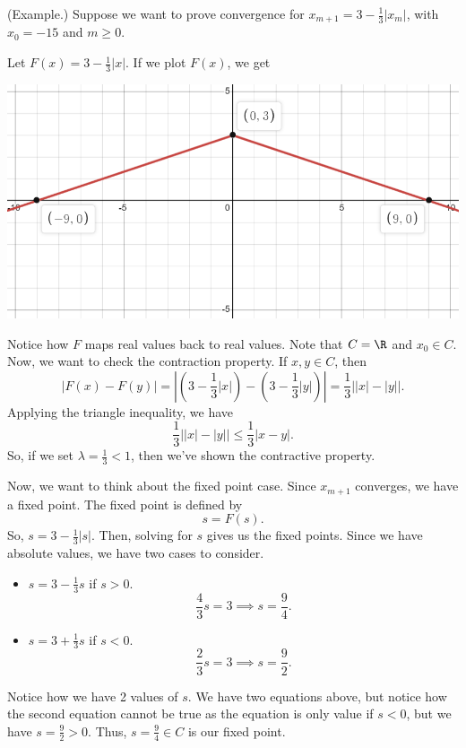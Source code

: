\documentclass[letterpaper]{article}
\begin{document}
\begin{mdframed}
    (Example.) Suppose we want to prove convergence for $x_{m + 1} = 3 - \frac{1}{3} |x_m|$, with $x_0 = -15$ and $m \geq 0$. 

    \bigskip 

    Let $F(x) = 3 - \frac{1}{3}|x|$. If we plot $F(x)$, we get 
    \begin{center}
        \includegraphics[scale=0.7]{../assets/contractive_ex1.png}
    \end{center}
    Notice how $F$ maps real values back to real values. Note that $C = \R$ and $x_0 \in C$. Now, we want to check the contraction property. If $x, y \in C$, then \[|F(x) - F(y)| = \left|\left(3 - \frac{1}{3}|x|\right) - \left(3 - \frac{1}{3}|y|\right)\right| = \frac{1}{3}\left||x| - |y|\right|.\]
    Applying the triangle inequality, we have 
    \[\frac{1}{3}\left||x| - |y|\right| \leq \frac{1}{3}|x - y|.\]
    So, if we set $\lambda = \frac{1}{3} < 1$, then we've shown the contractive property. 

    \bigskip 

    Now, we want to think about the fixed point case. Since $x_{m + 1}$ converges, we have a fixed point. The fixed point is defined by 
    \[s = F(s).\]
    So, $s = 3 - \frac{1}{3}|s|$. Then, solving for $s$ gives us the fixed points. Since we have absolute values, we have two cases to consider. 
    \begin{itemize}
        \item $s = 3 - \frac{1}{3}s$ if $s > 0$.
        \[\frac{4}{3}s = 3 \implies s = \frac{9}{4}.\]
        \item $s = 3 + \frac{1}{3}s$ if $s < 0$.
        \[\frac{2}{3}s = 3 \implies s = \frac{9}{2}.\]
    \end{itemize}
    Notice how we have 2 values of $s$. We have two equations above, but notice how the second equation cannot be true as the equation is only value if $s < 0$, but we have $s = \frac{9}{2} > 0$. Thus, $s = \frac{9}{4} \in C$ is our fixed point. 
\end{mdframed}
\end{document}
